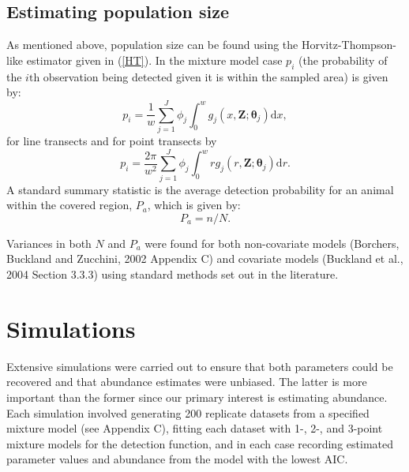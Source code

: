\documentclass[useAMS,referee, usegraphicx]{biom}
\begin{document}
\subsection{Estimating population size}

As mentioned above, population size can be found using the Horvitz-Thompson-like estimator given in (\ref{HT}). In the mixture model case $p_i$  (the probability of the $i\text{th}$ observation being detected given it is within the sampled area) is given by:
\begin{equation*}
p_i = \frac{1}{w} \sum_{j=1}^J \phi_j \int_0^w  g_j(x,\mathbf{Z}; \bm{\theta}_j) \text{d}x,
\end{equation*}
for line transects and for point transects by
\begin{equation*}
p_i = \frac{2\pi}{w^2} \sum_{j=1}^J \phi_j \int_0^w  r g_j(r,\mathbf{Z}; \bm{\theta}_j) \text{d}r.
\end{equation*}
A standard summary statistic is the average detection probability for an animal within the covered region, $P_a$, which is given by:
\begin{equation*}
P_a = n/N.
\end{equation*}

Variances in both $N$ and $P_a$ were found for both non-covariate models (Borchers, Buckland and Zucchini, 2002 Appendix C) and covariate models (Buckland et al., 2004 Section 3.3.3) using standard methods set out in the literature.

\section{Simulations}

Extensive simulations were carried out to ensure that both parameters could be recovered and that abundance estimates were unbiased. The latter is more important than the former since our primary interest is estimating abundance. Each simulation involved generating 200 replicate datasets from a specified mixture model (see Appendix C), fitting each dataset with 1-, 2-, and 3-point mixture models for the detection function, and in each case recording estimated parameter values and abundance from the model with the lowest AIC.
\end{document}
